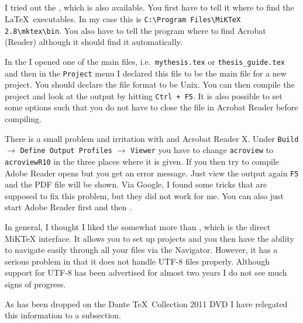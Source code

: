 \subsection{\TeXnicCenter}%
\label{sec:app:texnic}

I tried out the \TeXnicCenter, which is also available. You first
have to tell it where to find the \LaTeX\ executables. In my case
this is \texttt{C:\textbackslash Program Files\textbackslash MiKTeX
  2.8\textbackslash mktex\textbackslash bin}. You also have to tell
the program where to find Acrobat (Reader) although it should find it
automatically.

In the \TeXnicCenter I opened one of the main files, i.e.\
\texttt{mythesis.tex} or \texttt{thesis\_guide.tex} and then in the
\texttt{Project} menu I declared this file to be the main file for a
new project. You should declare the file format to be Unix. You can
then compile the project and look at the output by hitting
\texttt{Ctrl + F5}. It is also possible to set some options such that
you do not have to close the file in Acrobat Reader before compiling.

There is a small problem and irritation with \TeXnicCenter and
Acrobat Reader X. Under \texttt{Build} $\to$ \texttt{Define Output
  Profiles} $\to$ \texttt{Viewer} you have to change \texttt{acroview} to
\texttt{acroviewR10} in the three places where it is given. If you
then try to compile Adobe Reader opens but you get an error
message. Just view the output again \texttt{F5} and the PDF file will
be shown. Via Google, I found some tricks that are supposed to fix
this problem, but they did not work for me. You can also just start
Adobe Reader first and then \TeXnicCenter.

In general, I thought I liked the \TeXnicCenter somewhat more than
\TeXworks, which is the direct MiK\TeX{} interface. It allows you to
set up projects and you then have the ability to navigate easily
through all your files via the Navigator. However, it has a serious
problem in that it does not handle UTF-8 files properly. Although
support for UTF-8 has been advertised for almost two years I do not
see much signs of progress.

As \TeXnicCenter has been dropped on the Dante \TeX\ Collection 2011
DVD I have relegated this information to a subsection.


